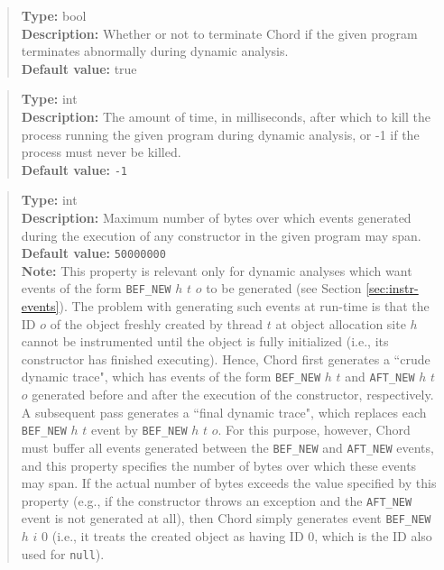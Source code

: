 \begin{quote}
{\bf Type:} bool \\
{\bf Description:} Whether or not to terminate Chord if the given program terminates abnormally during dynamic analysis. \\
{\bf Default value:} true
\end{quote}

\begin{quote}
{\bf Type:} int  \\
{\bf Description:} The amount of time, in milliseconds, after which to kill the process running the given program during dynamic analysis, or -1 if the process must never be killed. \\
{\bf Default value:} {\tt -1}
\end{quote}

\begin{quote}
{\bf Type:} int \\
{\bf Description:} Maximum number of bytes over which events generated during the execution of any constructor in the given program may span. \\
{\bf Default value:} {\tt 50000000} \\
{\bf Note:} This property is relevant only for dynamic analyses which want events of the form {\tt BEF\_NEW} $h$ $t$ $o$ to be generated (see Section \ref{sec:instr-events}).  The problem with generating such events at run-time is that the ID $o$ of the object freshly created by thread $t$ at object allocation site $h$ cannot be instrumented until the object is fully initialized (i.e., its constructor has finished executing).  Hence, Chord first generates a ``crude dynamic trace", which has events of the form {\tt BEF\_NEW} $h$ $t$ and {\tt AFT\_NEW} $h$ $t$ $o$ generated before and after the execution of the constructor, respectively.  A subsequent pass generates a ``final dynamic trace", which replaces each {\tt BEF\_NEW} $h$ $t$ event by {\tt BEF\_NEW} $h$ $t$ $o$.  For this purpose, however, Chord must buffer all events generated between the {\tt BEF\_NEW} and {\tt AFT\_NEW} events, and this property specifies the number of bytes over which these events may span.  If the actual number of bytes exceeds the value specified by this property (e.g., if the constructor throws an exception and the {\tt AFT\_NEW} event is not generated at all), then Chord simply generates event {\tt BEF\_NEW} $h$ $i$ $0$ (i.e., it treats the created object as having ID 0, which is the ID also used for {\tt null}). 
\end{quote}

